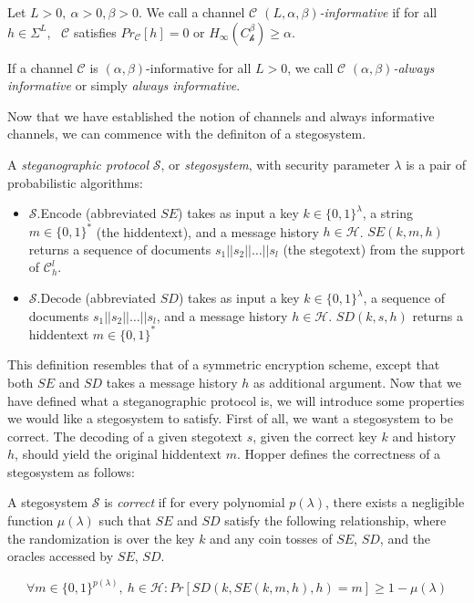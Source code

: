 \begin{definition}
	Let $L > 0,~ \alpha > 0, \beta > 0$. 
	We call a channel \emph{$\mathcal{C}$ $(L, \alpha, \beta)$-informative} if for all $h \in \Sigma^L$,~ $\mathcal{C}$ satisfies $Pr_{\mathcal{C}}[h] = 0$ or $H_{\infty}(C_{\mathcal{h}}^\beta) \geq \alpha$.
	
	If a channel $\mathcal{C}$ is $(\alpha, \beta)$-informative for all $L > 0$, we call $\mathcal{C}$ \emph{$(\alpha, \beta)$-always informative} or simply \emph{always informative}.
\end{definition}

Now that we have established the notion of channels and always informative channels, we can commence with the definiton of a stegosystem.

\begin{definition}
\label{def:stegosystem}
A \emph{steganographic protocol} $\mathcal{S}$, or \emph{stegosystem}, with security parameter $\lambda$ is a pair of probabilistic algorithms:

\begin{itemize}
	\item $\mathcal{S}$.Encode (abbreviated $SE$) takes as input a key $k \in \{0,1\}^\lambda$, a string $m \in \{0,1\}^*$ (the hiddentext), and a message history $h \in \mathcal{H}$.
		$SE(k, m, h)$ returns a sequence of documents $s_1||s_2||\dots||s_l$ (the stegotext) from the support of $\mathcal{C}_h^l$.
	\item $\mathcal{S}$.Decode (abbreviated $SD$) takes as input a key $k \in \{0,1\}^\lambda$, a sequence of documents $s_1||s_2||\dots||s_l$, and a message history $h \in \mathcal{H}$.
		$SD(k, s, h)$ returns a hiddentext $m \in \{0,1\}^*$
\end{itemize}
\end{definition}

This definition resembles that of a symmetric encryption scheme, except that both $SE$ and $SD$ takes a message history $h$ as additional argument.
Now that we have defined what a steganographic protocol is, we will introduce some properties we would like a stegosystem to satisfy.
First of all, we want a stegosystem to be correct.
The decoding of a given stegotext $s$, given the correct key $k$ and history $h$, should yield the original hiddentext $m$.
Hopper defines the correctness of a stegosystem as follows:

\begin{definition}
\label{def:correctness-hopper}
A stegosystem $\mathcal{S}$ is \emph{correct} if for every polynomial $p(\lambda)$, there exists a negligible function $\mu(\lambda)$ such that $SE$ and $SD$ satisfy the following relationship, where the randomization is over the key $k$ and any coin tosses of $SE$, $SD$, and the oracles accessed by $SE$, $SD$.

$$\forall m \in \{0,1\}^{p(\lambda)},~ h \in \mathcal{H} \colon Pr[SD(k, SE(k, m, h), h) = m] \geq 1 - \mu(\lambda)$$

\end{definition}

